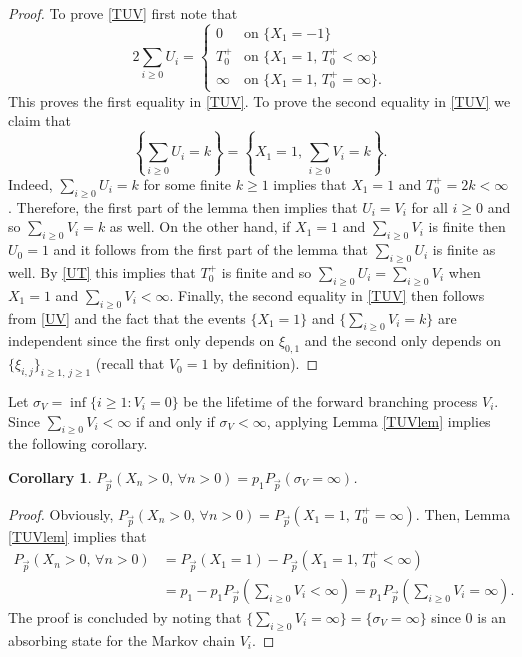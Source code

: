 \documentclass[reqno,letterpaper,11pt]{amsart}
\newtheorem{cor}[thm]{Corollary}
\theoremstyle{remark}
\theoremstyle{definition}
\begin{document}
\begin{proof}
To prove \eqref{TUV} first note that 
\begin{equation}\label{UT}
 2 \sum_{i\geq 0} U_i = 
\begin{cases}
 0 & \text{on } \{X_1 = -1\} \\
 T_0^+ & \text{on } \{ X_1 = 1, \, T_0^+ < \infty\} \\
 \infty & \text{on } \{X_1 = 1, \, T_0^+ = \infty\}. 
\end{cases}
\end{equation}
This proves the first equality in \eqref{TUV}. 
To prove the second equality in \eqref{TUV} we claim that 
\begin{equation}\label{UV}
 \left\{ \sum_{i\geq 0} U_i = k \right\} = \left\{ X_1 = 1, \, \sum_{i\geq 0} V_i = k \right\}. 
\end{equation}
Indeed, $\sum_{i\geq 0} U_i = k$ for some finite $k\geq 1$ implies that $X_1 = 1$ and $T_0^+ =2k < \infty$. Therefore, the first part of the lemma then implies that $U_i = V_i$ for all $i\geq 0$ and so $\sum_{i\geq 0} V_i = k$ as well. 
On the other hand, if $X_1 = 1$ and $\sum_{i\geq 0} V_i$ is finite then $U_0 = 1$ and it follows from the first part of the lemma that $\sum_{i\geq 0} U_i$ is finite as well. By \eqref{UT} this implies that $T_0^+$ is finite and so $\sum_{i\geq 0} U_i = \sum_{i\geq 0} V_i$ when $X_1 = 1$ and $\sum_{i\geq 0} V_i < \infty$. 
Finally, the second equality in \eqref{TUV} then follows from \eqref{UV} and the fact that the events $\{X_1 = 1\}$ and $\{\sum_{i\geq 0} V_i = k \}$ are independent since the first only depends on $\xi_{0,1}$ and the second only depends on $\{\xi_{i,j}\}_{i\geq 1, \, j\geq 1}$ (recall that $V_0 = 1$ by definition). 
\end{proof}

Let ${\sigma}_V = \inf \{ i \geq 1: V_i = 0 \}$ be the lifetime of the forward branching process $V_i$. Since $\sum_{i\geq 0} V_i < \infty$ if and only if ${\sigma}_V < \infty$, applying Lemma \ref{TUVlem} implies the following corollary. 
\begin{cor}\label{Transform}
 $P_{\vec{p}}( X_n > 0, \, \forall n > 0 ) = p_1 P_{\vec{p}}( {\sigma}_V = \infty )$. 
\end{cor}
\begin{proof}
 Obviously, $P_{\vec{p}}( X_n > 0, \, \forall n > 0 ) = P_{\vec{p}}( X_1 = 1, \, T_0^+ = \infty )$. Then, Lemma \ref{TUVlem} implies that 
\begin{align*}
 P_{\vec{p}}( X_n > 0, \, \forall n > 0 ) &= P_{\vec{p}}(X_1 = 1) - P_{\vec{p}}( X_1 = 1, \, T_0^+ < \infty ) \\
&= p_1 - p_1 P_{\vec{p}}\left( \sum_{i\geq 0} V_i < \infty \right) = p_1 P_{\vec{p}}\left( \sum_{i\geq 0} V_i = \infty \right). 
\end{align*}
The proof is concluded by noting that $\{ \sum_{i\geq 0} V_i = \infty \} = \{ {\sigma}_V = \infty \}$ since $0$ is an absorbing state for the Markov chain $V_i$. 
\end{proof}
\end{document}
